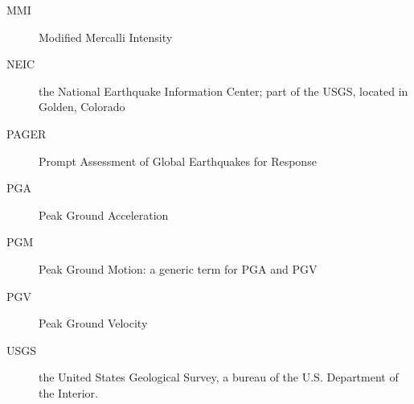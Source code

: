 \documentclass[letterpaper,10pt,english]{sphinxmanual}
\begin{document}
\begin{description}
\item[{MMI}] \leavevmode
Modified Mercalli Intensity

\item[{NEIC}] \leavevmode
the National Earthquake Information Center; part of the USGS, located in Golden, Colorado

\item[{PAGER}] \leavevmode
Prompt Assessment of Global Earthquakes for Response

\item[{PGA}] \leavevmode
Peak Ground Acceleration

\item[{PGM}] \leavevmode
Peak Ground Motion: a generic term for PGA and PGV

\item[{PGV}] \leavevmode
Peak Ground Velocity

\item[{USGS}] \leavevmode
the United States Geological Survey, a bureau of the U.S. Department of the Interior.

\end{description}



\renewcommand{\indexname}{Index}
\printindex
\end{document}
